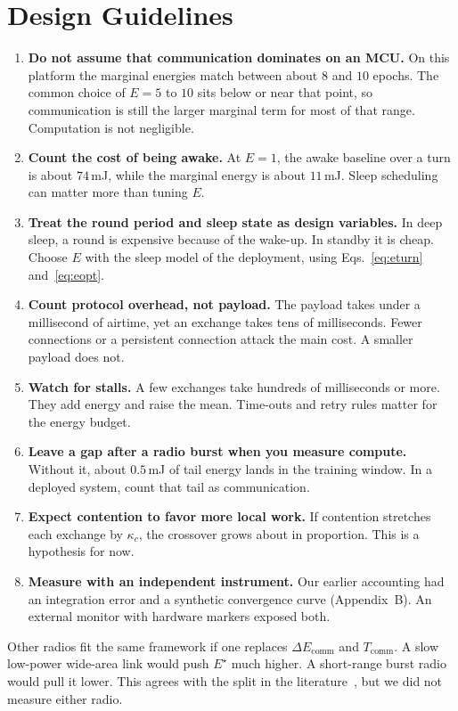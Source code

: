 \documentclass[journal]{IEEEtran}
\newcommand{\Estar}{E^{\star}}
\begin{document}
\section{Design Guidelines}
\label{sec:guidelines}
\begin{enumerate}
\item \textbf{Do not assume that communication dominates on an MCU.} On this platform the marginal energies match between about $8$ and $10$ epochs. The common choice of $E=5$ to $10$ sits below or near that point, so communication is still the larger marginal term for most of that range. Computation is not negligible.
\item \textbf{Count the cost of being awake.} At $E=1$, the awake baseline over a turn is about $74$\,mJ, while the marginal energy is about $11$\,mJ. Sleep scheduling can matter more than tuning $E$.
\item \textbf{Treat the round period and sleep state as design variables.} In deep sleep, a round is expensive because of the wake-up. In standby it is cheap. Choose $E$ with the sleep model of the deployment, using Eqs.~\eqref{eq:eturn} and~\eqref{eq:eopt}.
\item \textbf{Count protocol overhead, not payload.} The payload takes under a millisecond of airtime, yet an exchange takes tens of milliseconds. Fewer connections or a persistent connection attack the main cost. A smaller payload does not.
\item \textbf{Watch for stalls.} A few exchanges take hundreds of milliseconds or more. They add energy and raise the mean. Time-outs and retry rules matter for the energy budget.
\item \textbf{Leave a gap after a radio burst when you measure compute.} Without it, about $0.5$\,mJ of tail energy lands in the training window. In a deployed system, count that tail as communication.
\item \textbf{Expect contention to favor more local work.} If contention stretches each exchange by $\kappa_c$, the crossover grows about in proportion. This is a hypothesis for now.
\item \textbf{Measure with an independent instrument.} Our earlier accounting had an integration error and a synthetic convergence curve (Appendix~B). An external monitor with hardware markers exposed both.
\end{enumerate}
Other radios fit the same framework if one replaces $\Delta E_{\mathrm{comm}}$ and $T_{\mathrm{comm}}$. A slow low-power wide-area link would push $\Estar$ much higher. A short-range burst radio would pull it lower. This agrees with the split in the literature~\cite{gimenez2023embedded,ficco2024federated}, but we did not measure either radio.
\end{document}
